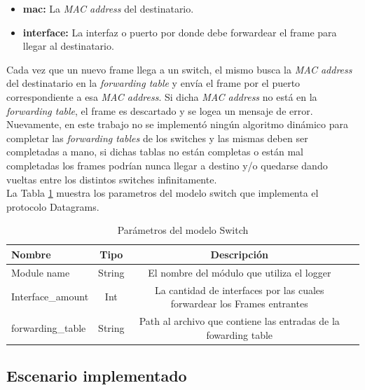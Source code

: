 \documentclass[10pt,a4paper]{article}
\begin{document}
\begin{itemize}
\item \textbf{mac: } La \textit{MAC address} del destinatario.
\item \textbf{interface: } La interfaz o puerto por donde debe forwardear el frame para llegar al destinatario.
\end{itemize}

Cada vez que un nuevo frame llega a un switch, el mismo busca la \textit{MAC address} del destinatario en la \textit{forwarding table} y envía el frame por el puerto correspondiente a esa \textit{MAC address}. Si dicha \textit{MAC address} no está en la \textit{forwarding table}, el frame es descartado y se logea un mensaje de error. \\

Nuevamente, en este trabajo no se implementó ningún algoritmo dinámico para completar las \textit{forwarding tables} de los switches y las mismas deben ser completadas a mano, si dichas tablas no están completas o están mal completadas los frames podrían nunca llegar a destino y/o quedarse dando vueltas entre los distintos switches infinitamente. \\

La Tabla \ref{table: parameters datagrams} muestra los parametros del modelo switch que implementa el protocolo Datagrams.

\begin{table}[h]
\begin{tabular}{|l|c|c|c|}
  \hline
  Nombre & Tipo & Descripción \\
  \hline
  Module name & String & El nombre del módulo que utiliza el logger \\
  \hline
  Interface\_amount & Int & La cantidad de interfaces por las cuales forwardear los Frames entrantes \\
  \hline
  forwarding\_table & String & Path al archivo que contiene las entradas de la fowarding table \\
  \hline
\end{tabular}
\caption{Parámetros del modelo Switch}
\label{table: parameters datagrams}
\end{table}

\subsection{Escenario implementado}
\end{document}
